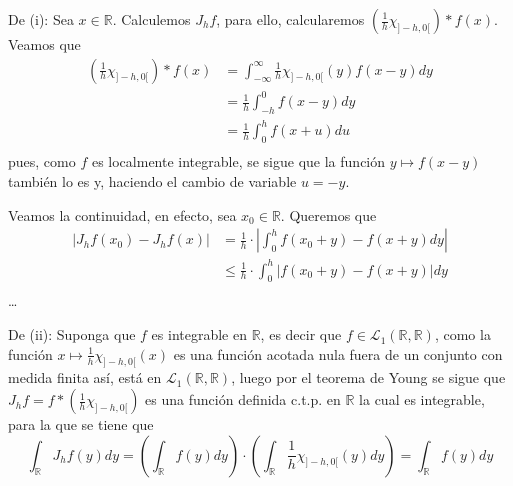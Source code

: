 \documentclass[12pt]{report}
\theoremstyle{largebreak}
\newcommand\abs[1]{\ensuremath{\left|#1\right|}}
\begin{document}
    \begin{sol}
        De (i): Sea $x\in\mathbb{R}$. Calculemos $J_hf$, para ello, calcularemos $\left(\frac{1}{h}\chi_{ ]-h,0[} \right)*f(x)$. Veamos que
        \begin{equation*}
            \begin{split}
                \left(\frac{1}{h}\chi_{ ]-h,0[} \right)*f(x)&=\int_{-\infty}^\infty\frac{1}{h}\chi_{ ]-h,0[}(y) f(x-y)dy\\
                &=\frac{1}{h}\int_{-h}^0f(x-y)dy\\
                &=\frac{1}{h}\int_{0}^hf(x+u)du\\
            \end{split}
        \end{equation*}
        pues, como $f$ es localmente integrable, se sigue que la función $y\mapsto f(x-y)$ también lo es y, haciendo el cambio de variable $u=-y$. 
        
        Veamos la continuidad, en efecto, sea $x_0\in\mathbb{R}$. Queremos que
        \begin{equation*}
            \begin{split}
                \abs{J_hf(x_0)-J_hf(x)}&=\frac{1}{h}\cdot\abs{\int_0^hf(x_0+y)-f(x+y)dy}\\
                &\leq\frac{1}{h}\cdot\int_0^h\abs{f(x_0+y)-f(x+y)}dy\\
            \end{split}
        \end{equation*}
        \dots

        De (ii): Suponga que $f$ es integrable en $\mathbb{R}$, es decir que $f\in\mathcal{L}_1(\mathbb{R},\mathbb{R})$, como la función $x\mapsto \frac{1}{h}\chi_{]-h,0[}(x)$ es una función acotada nula fuera de un conjunto con medida finita así, está en $\mathcal{L}_1(\mathbb{R},\mathbb{R})$, luego por el teorema de Young se sigue que $J_hf=f*\left(\frac{1}{h}\chi_{]-h,0[}\right)$ es una función definida c.t.p. en $\mathbb{R}$ la cual es integrable, para la que se tiene que
        \begin{equation*}
            \int_\mathbb{R} J_hf(y)dy=\left(\int_\mathbb{R}f(y)dy \right)\cdot\left(\int_\mathbb{R}\frac{1}{h}\chi_{]-h,0[}(y)dy \right)=\int_\mathbb{R}f(y)dy
        \end{equation*}


\end{sol}
\end{document}
